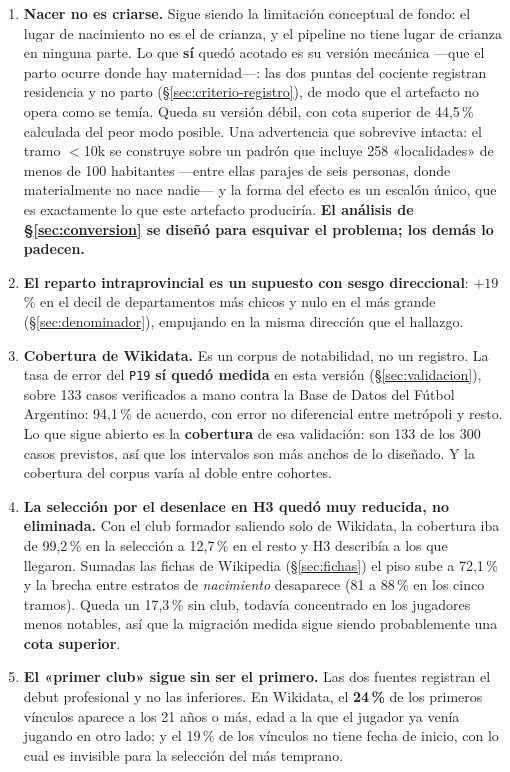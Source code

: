 \documentclass[11pt,a4paper]{article}
\begin{document}
\begin{enumerate}[leftmargin=1.6em,itemsep=0.3em]
  \item \textbf{Nacer no es criarse.} Sigue siendo la limitación conceptual de
    fondo: el lugar de nacimiento no es el de crianza, y el pipeline no tiene
    lugar de crianza en ninguna parte. Lo que \textbf{sí} quedó acotado es su
    versión mecánica —que el parto ocurre donde hay maternidad—: las dos puntas
    del cociente registran residencia y no parto (§\ref{sec:criterio-registro}),
    de modo que el artefacto no opera como se temía. Queda su versión débil, con
    cota superior de 44,5\,\% calculada del peor modo posible. Una advertencia que
    sobrevive intacta: el tramo $<$10k se construye sobre un padrón que incluye 258
    «localidades» de menos de 100 habitantes —entre ellas parajes de seis
    personas, donde materialmente no nace nadie— y la forma del efecto es un
    escalón único, que es exactamente lo que este artefacto produciría.
    \textbf{El análisis de §\ref{sec:conversion} se diseñó para esquivar el
    problema; los demás lo padecen.}
  \item \textbf{El reparto intraprovincial es un supuesto con sesgo
    direccional}: $+19$\,\% en el decil de departamentos más chicos y nulo en el
    más grande (§\ref{sec:denominador}), empujando en la misma dirección que el
    hallazgo.
  \item \textbf{Cobertura de Wikidata.} Es un corpus de notabilidad, no un
    registro. La tasa de error del \texttt{P19} \textbf{sí quedó medida} en esta
    versión (§\ref{sec:validacion}), sobre 133 casos verificados a mano contra la
    Base de Datos del Fútbol Argentino: 94,1\,\% de acuerdo, con error no
    diferencial entre metrópoli y resto. Lo que sigue abierto es la
    \textbf{cobertura} de esa validación: son 133 de los 300 casos previstos, así
    que los intervalos son más anchos de lo diseñado. Y la cobertura del corpus
    varía al doble entre cohortes.
  \item \textbf{La selección por el desenlace en H3 quedó muy reducida, no
    eliminada.} Con el club formador saliendo solo de Wikidata, la cobertura iba
    de 99,2\,\% en la selección a 12,7\,\% en el resto y H3 describía a los que
    llegaron. Sumadas las fichas de Wikipedia (§\ref{sec:fichas}) el piso sube a
    72,1\,\% y la brecha entre estratos de \emph{nacimiento} desaparece (81 a
    88\,\% en los cinco tramos). Queda un 17,3\,\% sin club, todavía concentrado
    en los jugadores menos notables, así que la migración medida sigue siendo
    probablemente una \textbf{cota superior}.
  \item \textbf{El «primer club» sigue sin ser el primero.} Las dos fuentes
    registran el debut profesional y no las inferiores. En Wikidata, el
    \textbf{24\,\%} de los primeros vínculos aparece a los 21 años o más, edad a
    la que el jugador ya venía jugando en otro lado; y el 19\,\% de los vínculos
    no tiene fecha de inicio, con lo cual es invisible para la selección del más
    temprano.


\end{enumerate}
\end{document}

